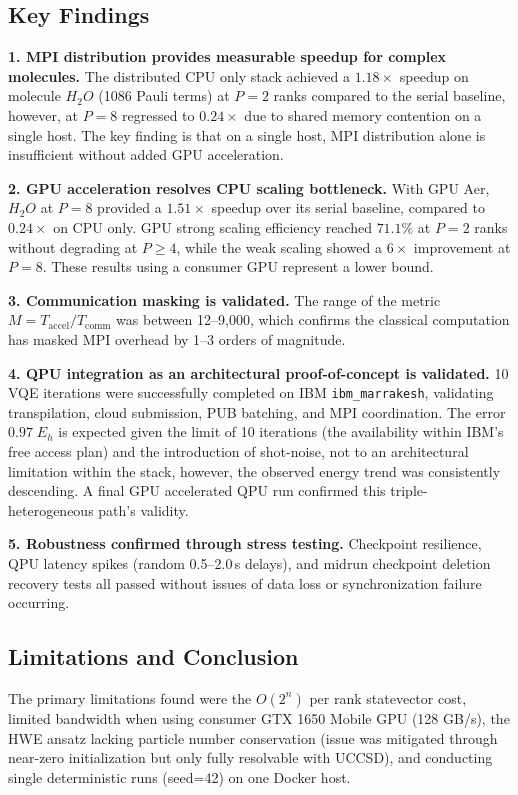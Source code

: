 \documentclass[12pt, letterpaper]{article}
\begin{document}
\subsection*{Key Findings}

\textbf{1. MPI distribution provides measurable speedup for complex molecules.} The distributed CPU only 
stack achieved a $1.18\times$ speedup on molecule $H_2O$ (1086 Pauli terms) at $P=2$ ranks compared to the 
serial baseline, however, at $P=8$ regressed to $0.24\times$ due to shared memory contention on a single host. The 
key finding is that on a single host, MPI distribution alone is insufficient without added GPU acceleration.

\textbf{2. GPU acceleration resolves CPU scaling bottleneck.} With GPU Aer, $H_2O$ at $P=8$ 
provided a $1.51\times$ speedup over its serial baseline, compared to $0.24\times$ on CPU only. GPU strong
scaling efficiency reached $71.1\%$ at $P=2$ ranks without degrading at $P \geq 4$, while the weak scaling 
showed a $6\times$ improvement at $P=8$. These results using a consumer GPU represent a lower bound.

\textbf{3. Communication masking is validated.} The range of the metric $M = T_{\text{accel}} / T_{\text{comm}}$ 
was between 12--9,000, which confirms the classical computation has masked MPI overhead by 1--3 orders of magnitude.

\textbf{4. QPU integration as an architectural proof-of-concept is validated.} 
10 VQE iterations were successfully completed on IBM \texttt{ibm\_marrakesh}, validating transpilation, cloud submission, 
PUB batching, and MPI coordination. The error $0.97\;E_h$ is expected given the limit of 10 iterations (the availability within IBM's free access plan)
and the introduction of shot-noise, not to an architectural limitation within the stack, however, the observed energy trend was consistently descending. 
A final GPU accelerated QPU run confirmed this triple-heterogeneous path's validity.

\textbf{5. Robustness confirmed through stress testing.} Checkpoint resilience, QPU latency spikes 
(random 0.5--2.0\,s delays), and midrun checkpoint deletion recovery tests all passed without issues 
of data loss or synchronization failure occurring.

\subsection*{Limitations and Conclusion}
The primary limitations found were the $O(2^n)$ per rank statevector cost, limited bandwidth when using consumer GTX 1650 Mobile GPU
(128 GB/s), the HWE ansatz lacking particle number conservation
(issue was mitigated through near-zero initialization but only fully resolvable with UCCSD), and conducting single 
deterministic runs (seed=42) on one Docker host.
\end{document}
